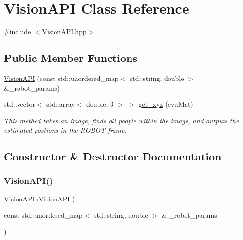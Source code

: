 \hypertarget{class_vision_a_p_i}{}\section{Vision\+A\+PI Class Reference}
\label{class_vision_a_p_i}


{\ttfamily \#include $<$Vision\+A\+P\+I.\+hpp$>$}

\subsection*{Public Member Functions}
\begin{DoxyCompactItemize}
\item 
\hyperlink{class_vision_a_p_i_a1ebc6d928618773c2fa97e2e593afaa4}{Vision\+A\+PI} (const std\+::unordered\+\_\+map$<$ std\+::string, double $>$ \&\+\_\+robot\+\_\+params)
\item 
std\+::vector$<$ std\+::array$<$ double, 3 $>$ $>$ \hyperlink{class_vision_a_p_i_a2abdb5d06b3c66789a970d541a44f55e}{get\+\_\+xyz} (cv\+::\+Mat)
\begin{DoxyCompactList}\small\item\em This method takes an image, finds all people within the image, and outputs the estimated postions in the R\+O\+B\+OT frame. \end{DoxyCompactList}\end{DoxyCompactItemize}


\subsection{Constructor \& Destructor Documentation}
\mbox{\label{class_vision_a_p_i_a1ebc6d928618773c2fa97e2e593afaa4}} 
\subsubsection{\texorpdfstring{Vision\+A\+P\+I()}{VisionAPI()}}
{\footnotesize\ttfamily Vision\+A\+P\+I\+::\+Vision\+A\+PI (\begin{DoxyParamCaption}\item[{const std\+::unordered\+\_\+map$<$ std\+::string, double $>$ \&}]{\+\_\+robot\+\_\+params }\end{DoxyParamCaption})\hspace{0.3cm}{\ttfamily [inline]}}



